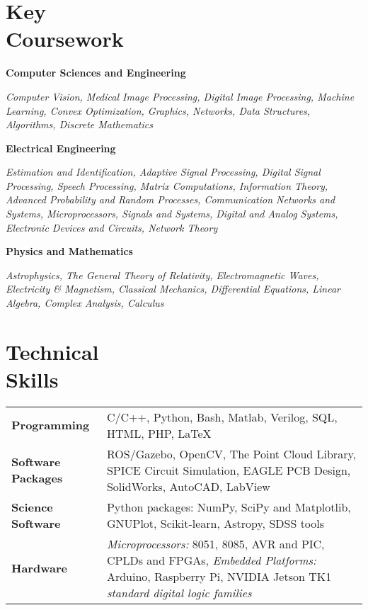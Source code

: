 \documentclass[margin,line]{res}
\newenvironment{list1}{
  \begin{list}{\ding{113}}{%
      \setlength{\itemsep}{0in}
      \setlength{\parsep}{0in} \setlength{\parskip}{0in}
      \setlength{\topsep}{0in} \setlength{\partopsep}{0in} 
      \setlength{\leftmargin}{0.17in}}}{\end{list}}
\begin{document}
\begin{resume}
\section{\sc Key \\Coursework} 
\begin{list1}
\item[\strut\hspace{0.5cm}\hypertarget{crselst}{\textbf{Computer Sciences and Engineering}}]
\item[]\textit{Computer Vision, Medical Image Processing, Digital Image Processing, Machine Learning, Convex Optimization, Graphics, Networks, Data Structures, Algorithms, Discrete Mathematics}
\item[\strut\hspace{0.5cm}\textbf{Electrical Engineering}]
\vspace{0.05in}
\item[]\textit{Estimation and Identification, Adaptive Signal Processing, Digital Signal Processing, Speech Processing, Matrix Computations, Information Theory, Advanced Probability and Random Processes, Communication Networks and Systems, Microprocessors, Signals and Systems, Digital and Analog Systems, Electronic Devices and Circuits, Network Theory}
\item[\strut\hspace{0.5cm}\textbf{Physics and Mathematics}]
\vspace{0.05in}
\item[]\textit{Astrophysics, The General Theory of Relativity, Electromagnetic Waves, Electricity \& Magnetism, Classical Mechanics, Differential Equations, Linear Algebra, Complex Analysis, Calculus}
\end{list1}

\section{\sc Technical \\Skills} 
\begin{tabular}{@{}p{1.3in}p{4.3in}}
\textbf{Programming} & C/C++, Python, Bash, Matlab, Verilog, SQL, HTML, PHP, \LaTeX \\  
\vspace*{-0.06in}
\textbf{Software Packages} & 
\vspace*{-0.06in}
ROS/Gazebo, OpenCV, The Point Cloud Library, SPICE Circuit Simulation, EAGLE PCB Design, SolidWorks, AutoCAD, LabView\\ 
\vspace*{-0.06in}
\textbf{Science Software} &
\vspace*{-0.06in}
Python packages: NumPy, SciPy and Matplotlib, GNUPlot, Scikit-learn, Astropy, SDSS tools \\
\vspace*{-0.06in}
\textbf{Hardware} &
\vspace*{-0.06in}
\textit{Microprocessors:} 8051, 8085, AVR and PIC, CPLDs and FPGAs, \textit{Embedded Platforms:} Arduino, Raspberry Pi, NVIDIA Jetson TK1 \textit{standard digital logic families} \\     
\end{tabular}


\end{resume}
\end{document}
